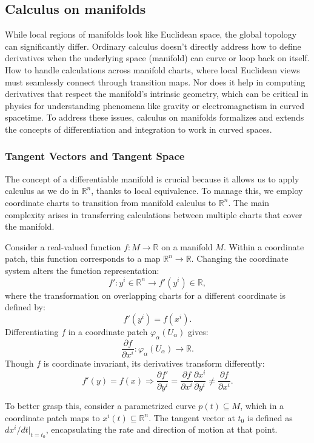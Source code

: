 \documentclass{article}
\begin{document}
\subsection{Calculus on manifolds}

While local regions of manifolds look like Euclidean space, the global topology can significantly differ. Ordinary calculus doesn't directly address how to define derivatives when the underlying space (manifold) can curve or loop back on itself.
How to handle calculations across manifold charts, where local Euclidean views must seamlessly connect through transition maps. Nor does it help in computing derivatives that respect the manifold's intrinsic geometry, which can be critical in physics for understanding phenomena like gravity or electromagnetism in curved spacetime. To address these issues, calculus on manifolds formalizes and extends the concepts of differentiation and integration to work in curved spaces. 

\subsubsection{Tangent Vectors and Tangent Space} 

The concept of a differentiable manifold is crucial because it allows us to apply calculus as we do in $\mathbb{R}^n$, thanks to local equivalence. To manage this, we employ coordinate charts to transition from manifold calculus to $\mathbb{R}^n$. The main complexity arises in transferring calculations between multiple charts that cover the manifold.

Consider a real-valued function $f : M \rightarrow \mathbb{R}$ on a manifold $M$. Within a coordinate patch, this function corresponds to a map $\mathbb{R}^n \rightarrow \mathbb{R}$. Changing the coordinate system alters the function representation:
\[
f' : y^i \in \mathbb{R}^n \rightarrow f'(y^i) \in \mathbb{R},
\]
where the transformation on overlapping charts for a different coordinate is defined by:
\[
f'(y^i) = f(x^i).
\]
Differentiating $f$ in a coordinate patch $\varphi_\alpha(U_\alpha)$ gives:
\[
\frac{\partial f}{\partial x^i} : \varphi_\alpha(U_\alpha) \rightarrow \mathbb{R}.
\]
Though $f$ is coordinate invariant, its derivatives transform differently:
\[
f'(y) = f(x) \Rightarrow \frac{\partial f'}{\partial y^i} = \frac{\partial f}{\partial x^i} \frac{\partial x^i}{\partial y^i} \neq \frac{\partial f}{\partial x^i}.
\]

To better grasp this, consider a parametrized curve $p(t) \subseteq M$, which in a coordinate patch maps to $x^i(t) \subseteq \mathbb{R}^n$. The tangent vector at $t_0$ is defined as $dx^i/dt |_{t=t_0}$, encapsulating the rate and direction of motion at that point. 
\end{document}
